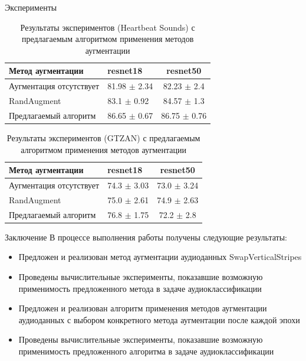 \documentclass[12pt, fleqn]{beamer}
\begin{document}
\begin{frame}{Эксперименты}
	\begin{table}[ht!]
    \centering
	\begin{tabular}{| l | l | c |}
    	\hline
	    Метод аугментации & resnet18 & resnet50 \\ \hline
	    Аугментация отсутствует  & 81.98 $\pm$ 2.34 & 82.23 $\pm$ 2.4 \\ \hline
	    RandAugment & 83.1 $\pm$ 0.92 & 84.57 $\pm$ 1.3 \\ \hline
	    Предлагаемый алгоритм & 86.65 $\pm$ 0.67 & 86.75 $\pm$ 0.76 \\ \hline
	\end{tabular}
	\caption{Результаты экспериментов (Heartbeat Sounds) с предлагаемым алгоритмом применения методов аугментации}
	\label{table:lukianov_pavel_t3}
\end{table}

    \begin{table}[ht!]
        \centering
    	\begin{tabular}{| l | l | c |}
        	\hline
    	    Метод аугментации & resnet18 & resnet50 \\ \hline
    	    Аугментация отсутствует  & 74.3 $\pm$ 3.03 & 73.0 $\pm$ 3.24 \\ \hline
    	    RandAugment & 75.0 $\pm$ 2.61 & 74.9 $\pm$ 2.63 \\ \hline
    	    Предлагаемый алгоритм & 76.8 $\pm$ 1.75 & 72.2 $\pm$ 2.8 \\ \hline
    	\end{tabular}
    	\caption{Результаты экспериментов (GTZAN) с предлагаемым алгоритмом применения методов аугментации}
    	\label{table:lukianov_pavel_t4}
    \end{table}
\end{frame}

\begin{frame}{Заключение}
	В процессе выполнения работы получены следующие результаты:
	\begin{itemize}
		\item Предложен и реализован метод аугментации аудиоданных SwapVerticalStripes
		\item Проведены вычислительные эксперименты, показавшие возможную применимость предложенного метода в задаче аудиоклассификации
		\item Предложен и реализован алгоритм применения методов аугментации аудиоданных с выбором конкретного метода аугментации после каждой эпохи
		\item Проведены вычислительные эксперименты, показавшие возможную применимость предложенного алгоритма в задаче аудиоклассификации
	\end{itemize}
\end{frame}
\end{document}
